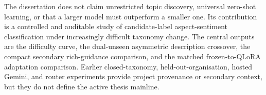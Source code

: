 The dissertation does not claim unrestricted topic discovery, universal
zero-shot learning, or that a larger model must outperform a smaller one. Its
contribution is a controlled and auditable study of candidate-label
aspect-sentiment classification under increasingly difficult taxonomy change.
The central outputs are the difficulty curve, the dual-unseen asymmetric
description crossover, the compact secondary rich-guidance comparison, and the
matched frozen-to-QLoRA adaptation comparison.
Earlier closed-taxonomy, held-out-organisation, hosted Gemini, and router
experiments provide project provenance or secondary context, but they do not
define the active thesis mainline.
